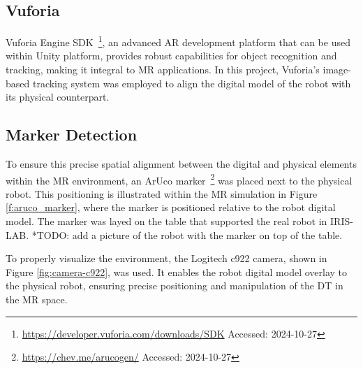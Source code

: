 \subsection{Vuforia}
\label{section:marker-detection}

Vuforia Engine \ac{SDK}~\footnote{\url{https://developer.vuforia.com/downloads/SDK} Accessed: 2024-10-27}, an advanced \ac{AR} development platform that can be used within Unity platform, provides robust capabilities for object recognition and tracking, making it integral to \ac{MR} applications. In this project, Vuforia's image-based tracking system was employed to align the digital model of the robot with its physical counterpart.

\subsection{Marker Detection}

To ensure this precise spatial alignment between the digital and physical elements within the \ac{MR} environment, an ArUco marker~\footnote{\url{https://chev.me/arucogen/} Accessed: 2024-10-27} was placed next to the physical robot. This positioning is illustrated within the \ac{MR} simulation in Figure \ref{f:aruco_marker}, where the marker is positioned relative to the robot digital model. The marker was layed on the table that supported the real robot in IRIS-LAB. *TODO: add a picture of the robot with the marker on top of the table.

To properly visualize the environment, the Logitech c922 camera, shown in Figure \ref{fig:camera-c922}, was used. It enables the robot digital model overlay to the physical robot, ensuring precise positioning and manipulation of the \ac{DT} in the \ac{MR} space.

